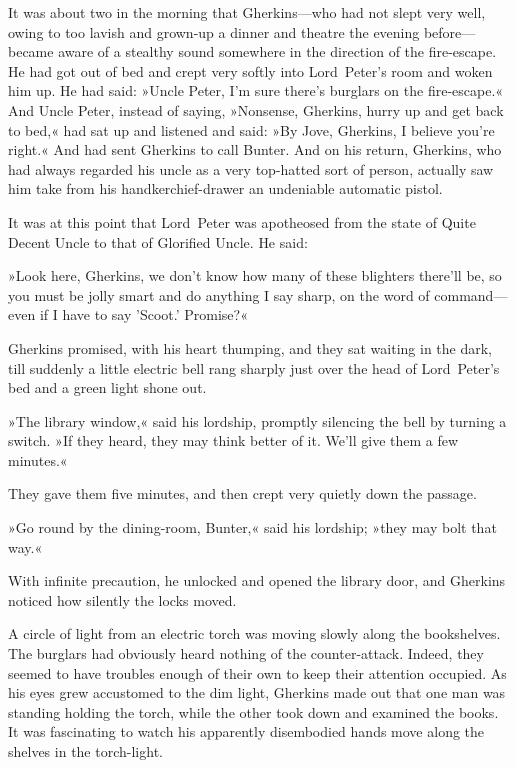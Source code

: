 It was about two in the morning that Gherkins—who had not slept very well, owing to too lavish and grown-up a dinner and theatre the evening before—became aware of a stealthy sound somewhere in the direction of the fire-escape. He had got out of bed and crept very softly into Lord~Peter's room and woken him up. He had said: »Uncle Peter, I'm sure there's burglars on the fire-escape.« And Uncle Peter, instead of saying, »Nonsense, Gherkins, hurry up and get back to bed,« had sat up and listened and said: »By Jove, Gherkins, I believe you're right.« And had sent Gherkins to call Bunter. And on his return, Gherkins, who had always regarded his uncle as a very top-hatted sort of person, actually saw him take from his handkerchief-drawer an undeniable automatic pistol.

It was at this point that Lord~Peter was apotheosed from the state of Quite Decent Uncle to that of Glorified Uncle. He said:

»Look here, Gherkins, we don't know how many of these blighters there'll be, so you must be jolly smart and do anything I say sharp, on the word of command—even if I have to say 'Scoot.' Promise?«

Gherkins promised, with his heart thumping, and they sat waiting in the dark, till suddenly a little electric bell rang sharply just over the head of Lord~Peter's bed and a green light shone out.

»The library window,« said his lordship, promptly silencing the bell by turning a switch. »If they heard, they may think better of it. We'll give them a few minutes.«

They gave them five minutes, and then crept very quietly down the passage.

»Go round by the dining-room, Bunter,« said his lordship; »they may bolt that way.«

With infinite precaution, he unlocked and opened the library door, and Gherkins noticed how silently the locks moved.

A circle of light from an electric torch was moving slowly along the bookshelves. The burglars had obviously heard nothing of the counter-attack. Indeed, they seemed to have troubles enough of their own to keep their attention occupied. As his eyes grew accustomed to the dim light, Gherkins made out that one man was standing holding the torch, while the other took down and examined the books. It was fascinating to watch his apparently disembodied hands move along the shelves in the torch-light.

